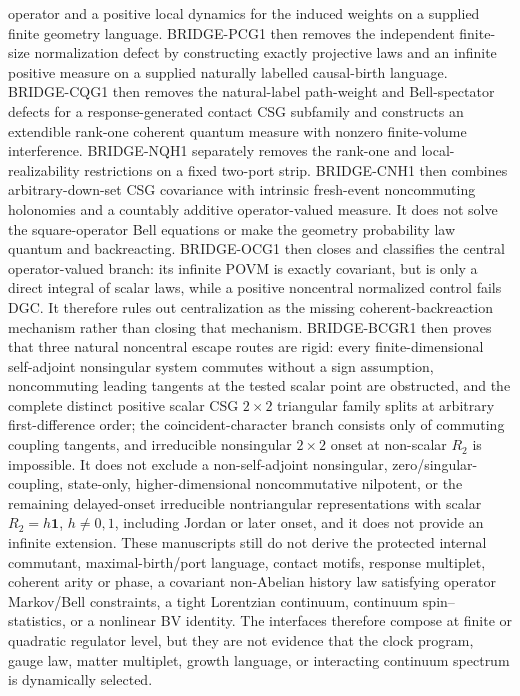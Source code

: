operator and a positive local dynamics for the induced weights on a supplied
finite geometry language.  BRIDGE-PCG1 then removes the independent
finite-size normalization defect by constructing exactly projective laws and
an infinite positive measure on a supplied naturally labelled causal-birth
language.  BRIDGE-CQG1 then removes the natural-label path-weight and
Bell-spectator defects for a response-generated contact CSG subfamily and
constructs an extendible rank-one coherent quantum measure with nonzero
finite-volume interference.  BRIDGE-NQH1 separately removes the rank-one
and local-realizability restrictions on a fixed two-port strip.
BRIDGE-CNH1 then combines arbitrary-down-set CSG covariance with intrinsic
fresh-event noncommuting holonomies and a countably additive operator-valued
measure.  It does not solve the square-operator Bell equations or make the
geometry probability law quantum and backreacting.  BRIDGE-OCG1 then closes
and classifies the central operator-valued branch: its infinite POVM is
exactly covariant, but is only a direct integral of scalar laws, while a
positive noncentral normalized control fails DGC.  It therefore rules out
centralization as the missing coherent-backreaction mechanism rather than
closing that mechanism.  BRIDGE-BCGR1 then proves that three natural
noncentral escape routes are rigid: every finite-dimensional self-adjoint
nonsingular system commutes without a sign assumption, noncommuting leading
tangents at the tested scalar point are obstructed, and the complete
distinct positive scalar CSG \(2\times2\) triangular family splits at
arbitrary first-difference order; the coincident-character branch consists
only of commuting coupling tangents, and irreducible nonsingular
\(2\times2\) onset at non-scalar \(R_2\) is impossible.  It does not
exclude a non-self-adjoint nonsingular, zero/singular-coupling, state-only,
higher-dimensional noncommutative nilpotent, or the remaining delayed-onset
irreducible nontriangular representations with scalar
\(R_2=h\mathbf1\), \(h\ne0,1\), including Jordan or later onset, and it
does not provide
an infinite extension.  These
manuscripts still do not derive the
protected internal commutant, maximal-birth/port language, contact motifs,
response multiplet, coherent arity or phase, a covariant non-Abelian history
law satisfying operator Markov/Bell constraints, a tight Lorentzian
continuum, continuum spin--statistics, or a nonlinear BV identity.  The
interfaces therefore compose at finite or quadratic
regulator level, but they are not evidence that the clock program, gauge law,
matter multiplet, growth language, or interacting continuum spectrum is
dynamically selected.

